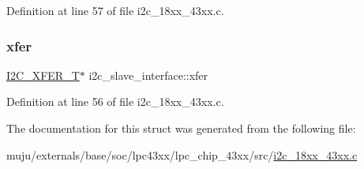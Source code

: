 Definition at line 57 of file i2c\+\_\+18xx\+\_\+43xx.\+c.

\mbox{\label{structi2c__slave__interface_a934caaab567fddcae9ebec6358047275}} 
\subsubsection{\texorpdfstring{xfer}{xfer}}
{\footnotesize\ttfamily \hyperlink{struct_i2_c___x_f_e_r___t}{I2\+C\+\_\+\+X\+F\+E\+R\+\_\+T}$\ast$ i2c\+\_\+slave\+\_\+interface\+::xfer}



Definition at line 56 of file i2c\+\_\+18xx\+\_\+43xx.\+c.



The documentation for this struct was generated from the following file\+:\begin{DoxyCompactItemize}
\item 
muju/externals/base/soc/lpc43xx/lpc\+\_\+chip\+\_\+43xx/src/\hyperlink{i2c__18xx__43xx_8c}{i2c\+\_\+18xx\+\_\+43xx.\+c}\end{DoxyCompactItemize}
